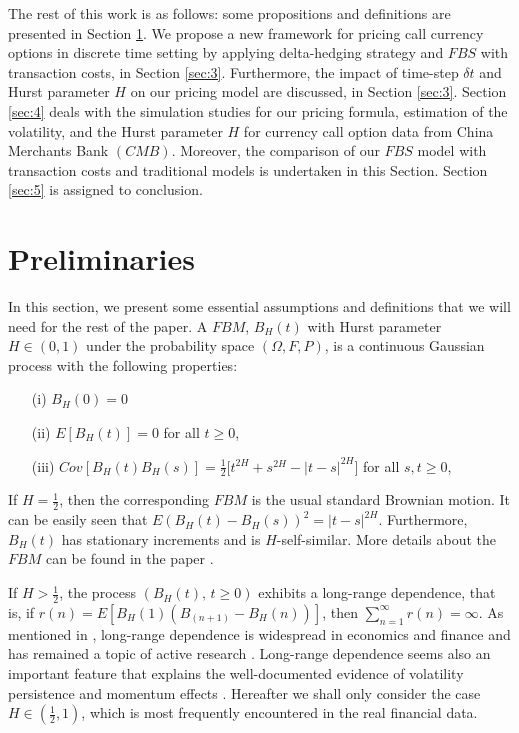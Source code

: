 \documentclass[a4paper,11pt]{amsart}
\numberwithin{equation}{section}
\theoremstyle{definition}
\theoremstyle{plain}
\theoremstyle{definition}
\newcommand{\1}{\mathbf{1}}
\begin{document}
The rest of this work is as follows: some propositions and definitions are presented in Section \ref{sec:2}. We propose a new framework for pricing call currency options in discrete time setting by applying delta-hedging strategy and $FBS$ with transaction costs, in Section \ref{sec:3}. Furthermore, the impact of time-step $\delta t$ and Hurst parameter $H$ on our pricing model are discussed, in Section \ref{sec:3}. Section \ref{sec:4} deals with the simulation studies for our pricing formula, estimation of the volatility, and  the Hurst parameter $H$ for currency call option data from  China Merchants Bank $(CMB)$. Moreover, the comparison of our $FBS$ model with transaction costs and traditional models is undertaken in this Section. Section \ref{sec:5} is assigned to conclusion.
















\section{Preliminaries }\label{sec:2}
In this section, we present some essential assumptions and definitions that we will need for the rest of the paper.
A  $FBM$, $B_H(t)$ with Hurst parameter $H\in (0,1)$ under  the probability space $(\Omega,F,P)$, is a continuous Gaussian process  with the following properties:
\begin{enumerate}
\item[(i)] $B_H(0)=0$
\item[(ii)]  $E[B_H(t)]=0$ for all $t\geq0$,
\item[(iii)]  $Cov[B_H(t)B_H(s)]=\frac{1}{2}\Big[t^{2H}+s^{2H}-|t-s|^{2H}\Big]$ for all $s,t\geq0$,
\end{enumerate}
If $H=\frac{1}{2}$, then the corresponding $FBM$ is the usual standard Brownian motion. It can be easily
seen that $E(B_H(t)-B_H(s))^2=|t-s|^{2H}$. Furthermore, $B_H(t)$ has stationary increments and is $H$-self-similar. More details
about the $FBM$ can be found in the paper \cite{lewellen}.

If $H>\frac{1}{2}$, the process $(B_H(t),\,t\geq 0)$ exhibits a long-range dependence, that is, if $r(n)=E[B_H(1)(B_(n+1)-B_H(n))]$,
then $\sum_{n=1}^\infty r(n)=\infty$. As mentioned in  \cite{chen}, long-range dependence is widespread in economics and finance and has
remained a topic of active research \cite{mandelbrot,cajueiro,cajueiro1}. Long-range dependence seems also an important
feature that explains the well-documented evidence of volatility persistence and momentum effects \cite{lewellen,cajueiro1}. Hereafter we
shall only consider the case $H\in(\frac{1}{2},1)$, which is most frequently encountered in the real financial data.
\end{document}
